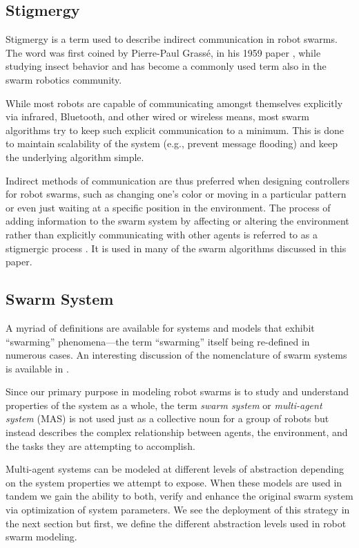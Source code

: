 \documentclass[defaultstyle,12pt]{thesis}
\begin{document}
\subsection{Stigmergy}
Stigmergy is a term used to describe indirect communication in robot swarms. The word was first coined by Pierre-Paul Grass\'e, in his 1959 paper \cite{Grasse1959}, while studying insect behavior and has become a commonly used term also in the swarm robotics community. 

While most robots are capable of communicating amongst themselves explicitly via infrared, Bluetooth\texttrademark, and other wired or wireless means, most swarm algorithms try to keep such explicit communication to a minimum. This is done to maintain scalability of the system (e.g., prevent message flooding) and keep the underlying algorithm simple.

Indirect methods of communication are thus preferred when designing controllers for robot swarms, such as changing one's color or moving in a particular pattern or even just waiting at a specific position in the environment. The process of adding information to the swarm system by affecting or altering the environment rather than explicitly communicating with other agents is referred to as a stigmergic process \cite{Balch2005}. It is used in many of the swarm algorithms discussed in this paper.


\subsection{Swarm System}
A myriad of definitions are available for systems and models that exhibit ``swarming'' phenomena---the term ``swarming'' itself being re-defined in numerous cases. An interesting discussion of the nomenclature of swarm systems is available in \cite{Beni2005,Beni2005a}.

Since our primary purpose in modeling robot swarms is to study and understand properties of the system as a whole, the term \emph{swarm system} or \emph{multi-agent system} (MAS) is not used just as a collective noun for a group of robots but instead describes the complex relationship between agents, the environment, and the tasks they are attempting to accomplish.

Multi-agent systems can be modeled at different levels of abstraction depending on the system properties we attempt to expose. When these models are used in tandem we gain the ability to both, verify and enhance the original swarm system via optimization of system parameters. We see the deployment of this strategy in the next section but first, we define the different abstraction levels used in robot swarm modeling.
\end{document}
